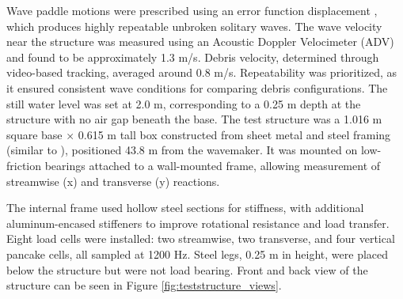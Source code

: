 \documentclass{article}
\begin{document}
{Wave paddle motions were prescribed using an error function displacement , which produces highly repeatable unbroken solitary waves. The wave velocity near the structure was measured using an Acoustic Doppler Velocimeter (ADV) and found to be approximately 1.3 m/s. Debris velocity, determined through video-based tracking, averaged around 0.8 m/s.
Repeatability was prioritized, as it ensured consistent wave conditions for comparing debris configurations. The still water level was set at 2.0 m, corresponding to a 0.25 m depth at the structure with no air gap beneath the base. The test structure was a 1.016 m square base × 0.615 m tall box constructed from sheet metal and steel framing (similar to \citep{winterTsunamiLikeWaveForces2020}), positioned 43.8 m from the wavemaker. It was mounted on low-friction bearings attached to a wall-mounted frame, allowing measurement of streamwise (x) and transverse (y) reactions.

The internal frame used hollow steel sections for stiffness, with additional aluminum-encased stiffeners to improve rotational resistance and load transfer. Eight load cells were installed: two streamwise, two transverse, and four vertical pancake cells, all sampled at 1200 Hz. Steel legs, 0.25 m in height, were placed below the structure but were not load bearing. Front and back view of the structure can be seen in Figure \ref{fig:teststructure_views}.

}
\end{document}
